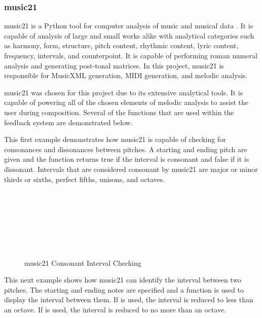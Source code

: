 \subsubsection{music21}
\label{subsubsec:music21}

music21 is a Python tool for computer analysis of music and musical data \cite{Cuthbert_2020}.  It is capable of analysis of large and small works alike with analytical categories such as harmony, form, structure, pitch content, rhythmic content, lyric content, frequency, intervals, and counterpoint.  It is capable of performing roman numeral analysis and generating post-tonal matrices.  In this project, music21 is responsible for MusicXML generation, MIDI generation, and melodic analysis.

\vspace{\baselineskip}

music21 was chosen for this project due to its extensive analytical tools.  It is capable of powering all of the chosen elements of melodic analysis to assist the user during composition.  Several of the functions that are used within the feedback system are demonstrated below.

\vspace{\baselineskip}

This first example demonstrates how music21 is capable of checking for consonances and dissonances between pitches.  A starting and ending pitch are given and the function returns true if the interval is consonant and false if it is dissonant.  Intervals that are considered consonant by music21 are major or minor thirds or sixths, perfect fifths, unisons, and octaves.

\begin{figure}[!htbp]
	\caption{music21 Consonant Interval Checking \cite{Cuthbert_2020}}
	 \\
	 \\
	 \\
	 \\
	 \\
	 \\
\end{figure}

This next example shows how music21 can identify the interval between two pitches.  The starting and ending notes are specified and a function is used to display the interval between them.  If  is used, the interval is reduced to less than an octave.  If  is used, the interval is reduced to no more than an octave.

